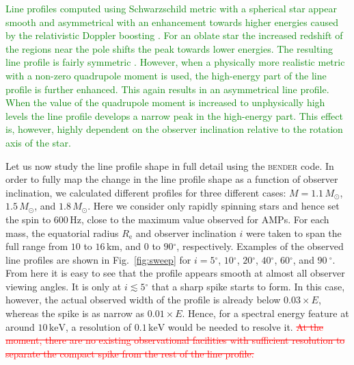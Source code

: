 \documentclass{aa}
\newcommand{\refe}[1]{\textcolor{green}{{#1}}}
\newcommand{\refedel}[1]{\textcolor{red}{\sout{#1}}}
\newcommand{\sch}{Schwarzschild }
\newcommand{\Msun}{\ensuremath{M_{\odot}}}
\renewcommand{\deg}{\ensuremath{^{\circ}}}
\begin{document}
\refe{Line profiles computed using \sch metric with a spherical star appear smooth and asymmetrical with an enhancement towards higher energies caused by the relativistic Doppler boosting \citep[see e.g.][]{OP03}.}
\refe{For an oblate star the increased redshift of the regions near the pole shifts the peak towards lower energies.}
\refe{The resulting line profile is fairly symmetric \citep[see e.g.][]{BPO13}.}
\refe{However, when a physically more realistic metric with a non-zero quadrupole moment is used, the high-energy part of the line profile is further enhanced.}
\refe{This again results in an asymmetrical line profile.}
\refe{When the value of the quadrupole moment is increased to unphysically high levels the line profile develops a narrow peak in the high-energy part.}
\refe{This effect is, however, highly dependent on the observer inclination relative to the rotation axis of the star.}


Let us now study the line profile shape in full detail using the \textsc{bender} code.
In order to fully map the change in the line profile shape as a function of observer inclination, we calculated different profiles for three different cases: $M=1.1\,\Msun$, $1.5\,\Msun$, and $1.8\,\Msun$.
Here we consider only rapidly spinning stars and hence set the spin to $600\,\mathrm{Hz}$, close to the maximum value observed for AMPs.
For each mass, the equatorial radius $R_{\mathrm{e}}$ and observer inclination $i$ were taken to span the full range from $10$ to $16\,\mathrm{km}$, and $0$ to $90\deg$, respectively.
Examples of the observed line profiles are shown in Fig.~\ref{fig:sweep} for $i=5\deg$, $10\deg$, $20\deg$, $40\deg$, $60\deg$, and $90~\deg$.
From here it is easy to see that the profile appears smooth at almost all observer viewing angles.
It is only at $i \lesssim 5\deg$ that a sharp spike starts to form.
In this case, however, the actual observed width of the profile is already below $0.03 \times E$, whereas the spike is as narrow as $0.01 \times E$.
Hence, for a spectral energy feature at around $10\,\mathrm{keV}$, a resolution of $0.1\,\mathrm{keV}$ would be needed to resolve it.
\refedel{At the moment, there are no existing observational facilities with sufficient resolution to separate the compact spike from the rest of the line profile.}
\end{document}
